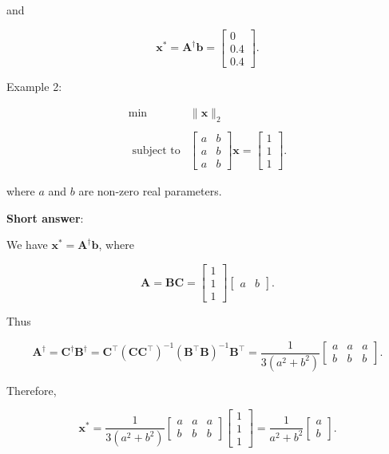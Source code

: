 and

\[
	\boldsymbol{x}^{*}=\boldsymbol{A}^{\dagger} \boldsymbol{b}=\left[\begin{array}{c}
		0 \\
		0.4 \\
		0.4
	\end{array}\right] .
\]

Example 2:

\[
	\begin{array}{rl}
		\min & \|\boldsymbol{x}\|_{2} \\
		& \\
		\text { subject to} & {\left[\begin{array}{ll}
				a & b \\
				a & b \\
				a & b
			\end{array}\right] \boldsymbol{x}=\left[\begin{array}{l}
				1 \\
				1 \\
				1
			\end{array}\right]. }
	\end{array}
\]

where \(a\) and \(b\) are non-zero real parameters.

\textbf{Short answer}:

We have \(\boldsymbol{x}^{*}=\boldsymbol{A}^{\dagger} \boldsymbol{b}\), where

\[
	\boldsymbol{A}=\boldsymbol{B} \boldsymbol{C}=\left[\begin{array}{l}
		1 \\
		1 \\
		1
	\end{array}\right]\left[\begin{array}{ll}
		a & b
	\end{array}\right] .
\]

Thus

\[
	\boldsymbol{A}^{\dagger}=\boldsymbol{C}^{\dagger} \boldsymbol{B}^{\dagger}=\boldsymbol{C}^{\top}\left(\boldsymbol{C} \boldsymbol{C}^{\top}\right)^{-1}\left(\boldsymbol{B}^{\top} \boldsymbol{B}\right)^{-1} \boldsymbol{B}^{\top}=\frac{1}{3\left(a^{2}+b^{2}\right)}\left[\begin{array}{ccc}
		a & a & a \\
		b & b & b
	\end{array}\right] .
\]

Therefore,

\[
	\boldsymbol{x}^{*}=\frac{1}{3\left(a^{2}+b^{2}\right)}\left[\begin{array}{lll}
		a & a & a \\
		b & b & b
	\end{array}\right]\left[\begin{array}{l}
		1 \\
		1 \\
		1
	\end{array}\right]=\frac{1}{a^{2}+b^{2}}\left[\begin{array}{l}
		a \\
		b
	\end{array}\right] .
\]


